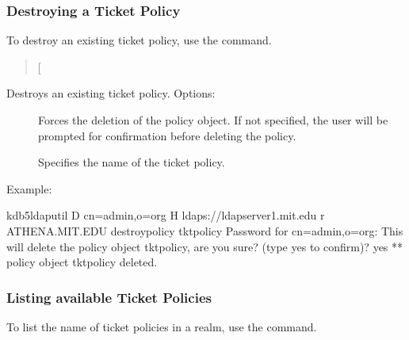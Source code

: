 \documentclass[letterpaper,10pt,english]{sphinxmanual}
\begin{document}
\subsubsection{Destroying a Ticket Policy}
\label{\detokenize{admin/database:destroying-a-ticket-policy}}
To destroy an existing ticket policy, use the {\hyperref[\detokenize{admin/admin_commands/kdb5_ldap_util:kdb5-ldap-util-8}]{}}
 command.
\begin{quote}

{[}\sphinxstylestrong{-force}{]}
\end{quote}

Destroys an existing ticket policy.  Options:
\begin{description}
\item[{}] \leavevmode
Forces the deletion of the policy object.  If not specified, the
user will be prompted for confirmation before deleting the policy.

\item[{}] \leavevmode
Specifies the name of the ticket policy.

\end{description}

Example:

%
\begin{sphinxVerbatim}[commandchars=\\\{\}]
kdb5\PYGZus{}ldap\PYGZus{}util \PYGZhy{}D cn=admin,o=org \PYGZhy{}H ldaps://ldap\PYGZhy{}server1.mit.edu
    \PYGZhy{}r ATHENA.MIT.EDU destroy\PYGZus{}policy tktpolicy
Password for \PYGZdq{}cn=admin,o=org\PYGZdq{}:
This will delete the policy object \PYGZsq{}tktpolicy\PYGZsq{}, are you sure?
(type \PYGZsq{}yes\PYGZsq{} to confirm)? yes
** policy object \PYGZsq{}tktpolicy\PYGZsq{} deleted.
\end{sphinxVerbatim}


\subsubsection{Listing available Ticket Policies}
\label{\detokenize{admin/database:listing-available-ticket-policies}}
To list the name of ticket policies in a realm, use the
{\hyperref[\detokenize{admin/admin_commands/kdb5_ldap_util:kdb5-ldap-util-8}]{}}  command.
\begin{quote}

\end{quote}
\end{document}
